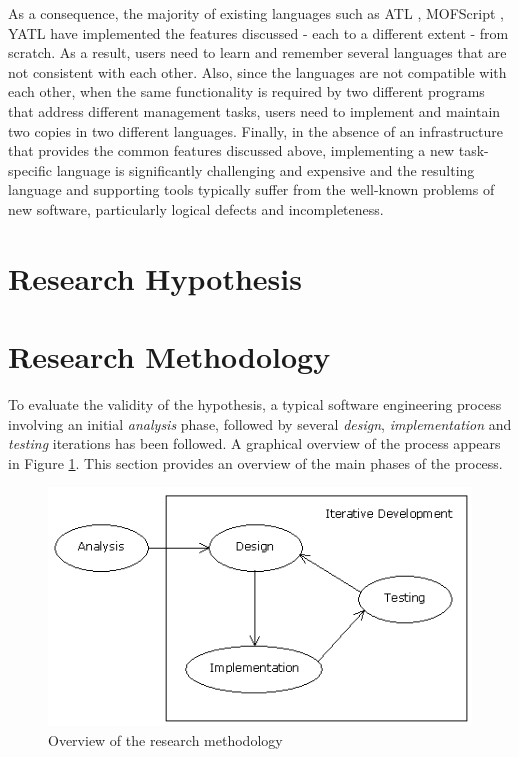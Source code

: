\noindent As a consequence, the majority of existing languages such as ATL \cite{ATL}, MOFScript \cite{MOFScript}, YATL \cite{Patrascoiu2004} have implemented the features discussed - each to a different extent - from scratch. As a result, users need to learn and remember several languages that are not consistent with each other. Also, since the languages are not compatible with each other, when the same functionality is required by two different programs that address different management tasks, users need to implement and maintain two copies in two different languages. Finally, in the absence of an infrastructure that provides the common features discussed above, implementing a new task-specific language is significantly challenging and expensive and the resulting language and supporting tools typically suffer from the well-known problems of new software, particularly logical defects and incompleteness.

\section{Research Hypothesis}
\label{sec:Analysis.Hypothesis}



\section{Research Methodology}
\label{sec:Analysis.ResearchMethodology}

To evaluate the validity of the hypothesis, a typical software engineering process involving an initial \emph{analysis} phase, followed by several \emph{design}, \emph{implementation} and \emph{testing} iterations has been followed. A graphical overview of the process appears in Figure \ref{fig:ResearchMethodology2}. This section provides an overview of the main phases of the process.

\begin{figure}
	\centering
		\includegraphics{images/ResearchMethodology}
	\caption{Overview of the research methodology}
	\label{fig:ResearchMethodology2}
\end{figure}

